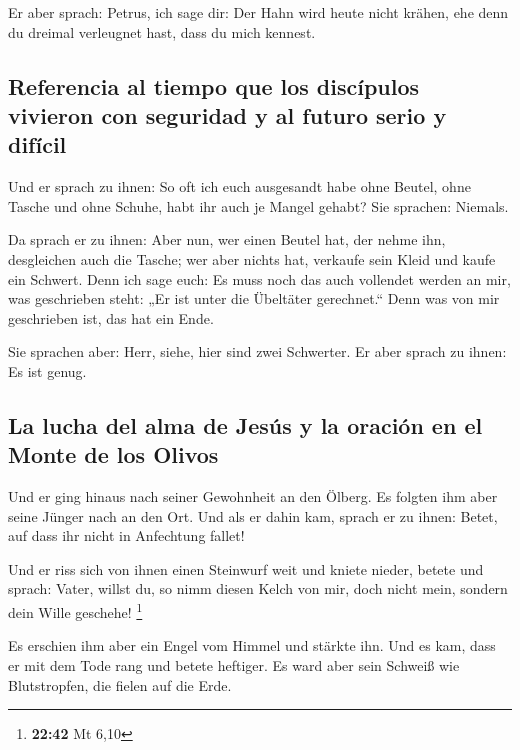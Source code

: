  Er aber sprach: Petrus, ich sage dir: Der Hahn wird
heute nicht krähen, ehe denn du dreimal verleugnet hast, dass du mich
kennest.

\hypertarget{referencia-al-tiempo-que-los-discuxedpulos-vivieron-con-seguridad-y-al-futuro-serio-y-difuxedcil}{%
\subsection{Referencia al tiempo que los discípulos vivieron con
seguridad y al futuro serio y
difícil}\label{referencia-al-tiempo-que-los-discuxedpulos-vivieron-con-seguridad-y-al-futuro-serio-y-difuxedcil}}

 Und er sprach zu ihnen: So oft ich euch ausgesandt habe
ohne Beutel, ohne Tasche und ohne Schuhe, habt ihr auch je Mangel
gehabt? Sie sprachen: Niemals.

 Da sprach er zu ihnen: Aber nun, wer einen Beutel hat,
der nehme ihn, desgleichen auch die Tasche; wer aber nichts hat,
verkaufe sein Kleid und kaufe ein Schwert.  Denn ich sage
euch: Es muss noch das auch vollendet werden an mir, was geschrieben
steht: „Er ist unter die Übeltäter gerechnet.`` Denn was von mir
geschrieben ist, das hat ein Ende.

 Sie sprachen aber: Herr, siehe, hier sind zwei
Schwerter. Er aber sprach zu ihnen: Es ist genug.

\hypertarget{la-lucha-del-alma-de-jesuxfas-y-la-oraciuxf3n-en-el-monte-de-los-olivos}{%
\subsection{La lucha del alma de Jesús y la oración en el Monte de los
Olivos}\label{la-lucha-del-alma-de-jesuxfas-y-la-oraciuxf3n-en-el-monte-de-los-olivos}}

 Und er ging hinaus nach seiner Gewohnheit an den Ölberg.
Es folgten ihm aber seine Jünger nach an den Ort.  Und
als er dahin kam, sprach er zu ihnen: Betet, auf dass ihr nicht in
Anfechtung fallet!

 Und er riss sich von ihnen einen Steinwurf weit und
kniete nieder, betete  und sprach: Vater, willst du, so
nimm diesen Kelch von mir, doch nicht mein, sondern dein Wille geschehe!
\footnote{\textbf{22:42} Mt 6,10}

 Es erschien ihm aber ein Engel vom Himmel und stärkte
ihn.  Und es kam, dass er mit dem Tode rang und betete
heftiger. Es ward aber sein Schweiß wie Blutstropfen, die fielen auf die
Erde.

